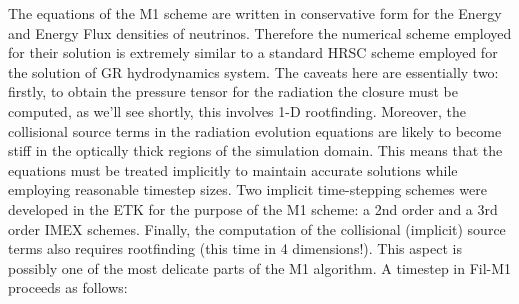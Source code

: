 The equations of the M1 scheme are written in conservative form for the Energy and Energy Flux densities of neutrinos. Therefore the numerical scheme employed for their solution is extremely similar to a standard HRSC scheme employed for the solution of GR hydrodynamics system. The caveats here are essentially two: firstly, to obtain the pressure tensor for the radiation the closure must be computed, as we'll see shortly, this involves 1-D rootfinding. Moreover, the collisional source terms in the radiation evolution equations are likely to become stiff in the optically thick regions of the simulation domain. This means that the equations must be treated implicitly to maintain accurate solutions while employing reasonable timestep sizes. Two implicit time-stepping schemes were developed in the ETK for the purpose of the M1 scheme: a 2nd order and a 3rd order IMEX schemes. Finally, the computation of the collisional (implicit) source terms also requires rootfinding (this time in 4 dimensions!). This aspect is possibly one of the most delicate parts of the M1 algorithm.
A timestep in Fil-M1 proceeds as follows:
